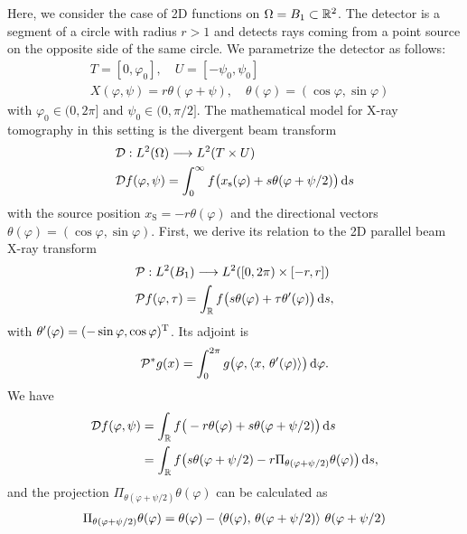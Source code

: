 \documentclass{amsart}
\renewcommand*{\phi}{\varphi}
\begin{document}
\begin{example}
 Here, we consider the case of 2D functions on $\Omega = B_1 \subset {\ensuremath{\mathbb{R}}}^2$. The detector is a segment of a circle with radius $r > 1$ and 
 detects rays coming from a point source on the opposite side of the same circle. We parametrize the detector as follows:
 \begin{align*}
  & T = [0, \phi_0],\quad U = [-\psi_0, \psi_0] \\
  & X(\phi, \psi) = r \theta(\phi + \psi), \quad \theta(\phi) = (\cos\phi, \sin\phi)
 \end{align*}
 with $\phi_0 \in (0, 2\pi]$ and $\psi_0 \in (0, \pi/2]$. The mathematical model for X-ray tomography in this setting is the divergent beam 
 transform
 \begin{align}
  &\OPD: L^2(\Omega) \Lto L^2(T \times U) \notag\\
  \label{eq:fanbeam_fwdproj}
  &\OPD f(\phi, \psi) = \int_0^\infty f\big(x_{\mathrm{s}}(\phi) + s \theta(\phi + \psi/2)\big)\, \D s
 \end{align}
 with the source position $x_{\mathrm{S}} = -r \theta(\phi)$ and the directional vectors $\theta(\phi) = (\cos\phi, \sin\phi)$. First, 
 we derive its relation to the 2D parallel beam X-ray transform
 \begin{align}
  &\OPP: L^2(B_1) \Lto L^2([0,2\pi) \times [-r,r]) \notag \\
  \label{eq:fanbeam_xray_fwdproj}
  &\OPP f(\phi, \tau) = \int_\RR f\big(s\theta(\phi) + \tau \theta'(\phi)\big)\, \D s,
 \end{align} 
 with $\theta'(\phi) = \TRANSP{(-\sin\phi, \cos\phi)}$. Its adjoint is
 \begin{equation}
  \label{eq:fanbeam_xray_backproj}
  \DUALOPP g(x) = \int_0^{2\pi} g\big(\phi, \INNER{x}{\theta'(\phi)}\big)\, \D\phi.
 \end{equation} 
 We have
 \begin{align*}
  \OPD f(\phi, \psi) 
  &= \int_\RR f\big(- r\theta(\phi) + s \theta(\phi + \psi/2)\big)\, \D s \\
  &= \int_\RR f\big(s \theta(\phi + \psi/2) - r \Pi_{\theta(\phi + \psi/2)}\theta(\phi) \big)\, \D s,
 \end{align*}
 and the projection $\Pi_{\theta(\phi + \psi/2)}\theta(\phi)$ can be calculated as
 \begin{align*}
  \Pi_{\theta(\phi + \psi/2)}\theta(\phi)
  &= \theta(\phi) - \INNERLR{\theta(\phi)}{\theta(\phi + \psi/2)}\, \theta(\phi + \psi/2) \\

\end{align*}
\end{example}
\end{document}
